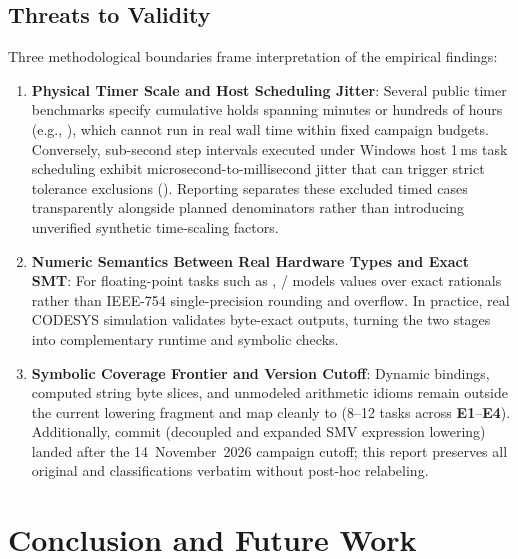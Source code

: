 
\subsection{Threats to Validity}
Three methodological boundaries frame interpretation of the empirical findings:
\begin{enumerate}
  \item \textbf{Physical Timer Scale and Host Scheduling Jitter}: Several public timer benchmarks specify cumulative holds spanning minutes or hundreds of hours (e.g., ), which cannot run in real wall time within fixed campaign budgets. Conversely, sub-second step intervals executed under Windows host 1\,ms task scheduling exhibit microsecond-to-millisecond jitter that can trigger strict tolerance exclusions (). Reporting separates these excluded timed cases transparently alongside planned denominators rather than introducing unverified synthetic time-scaling factors.
  \item \textbf{Numeric Semantics Between Real Hardware Types and Exact SMT}: For floating-point tasks such as , / models  values over exact rationals rather than IEEE-754 single-precision rounding and overflow. In practice, real CODESYS simulation validates byte-exact  outputs, turning the two stages into complementary runtime and symbolic checks.
  \item \textbf{Symbolic Coverage Frontier and Version Cutoff}: Dynamic  bindings, computed string byte slices, and unmodeled arithmetic idioms remain outside the current  lowering fragment and map cleanly to  (8--12 tasks across \textbf{E1}--\textbf{E4}). Additionally, commit  (decoupled  and expanded SMV expression lowering) landed after the 14~November~2026 campaign cutoff; this report preserves all original  and  classifications verbatim without post-hoc relabeling.
\end{enumerate}

\section{Conclusion and Future Work}

